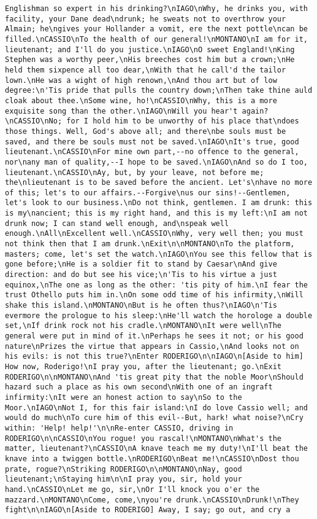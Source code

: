 \begin{verbatim}
Englishman so expert in his drinking?\nIAGO\nWhy, he drinks you, with facility, your Dane dead\ndrunk; he sweats not to overthrow your Almain; he\ngives your Hollander a vomit, ere the next pottle\ncan be filled.\nCASSIO\nTo the health of our general!\nMONTANO\nI am for it, lieutenant; and I'll do you justice.\nIAGO\nO sweet England!\nKing Stephen was a worthy peer,\nHis breeches cost him but a crown;\nHe held them sixpence all too dear,\nWith that he call'd the tailor lown.\nHe was a wight of high renown,\nAnd thou art but of low degree:\n'Tis pride that pulls the country down;\nThen take thine auld cloak about thee.\nSome wine, ho!\nCASSIO\nWhy, this is a more exquisite song than the other.\nIAGO\nWill you hear't again?\nCASSIO\nNo; for I hold him to be unworthy of his place that\ndoes those things. Well, God's above all; and there\nbe souls must be saved, and there be souls must not be saved.\nIAGO\nIt's true, good lieutenant.\nCASSIO\nFor mine own part,--no offence to the general, nor\nany man of quality,--I hope to be saved.\nIAGO\nAnd so do I too, lieutenant.\nCASSIO\nAy, but, by your leave, not before me; the\nlieutenant is to be saved before the ancient. Let's\nhave no more of this; let's to our affairs.--Forgive\nus our sins!--Gentlemen, let's look to our business.\nDo not think, gentlemen. I am drunk: this is my\nancient; this is my right hand, and this is my left:\nI am not drunk now; I can stand well enough, and\nspeak well enough.\nAll\nExcellent well.\nCASSIO\nWhy, very well then; you must not think then that I am drunk.\nExit\n\nMONTANO\nTo the platform, masters; come, let's set the watch.\nIAGO\nYou see this fellow that is gone before;\nHe is a soldier fit to stand by Caesar\nAnd give direction: and do but see his vice;\n'Tis to his virtue a just equinox,\nThe one as long as the other: 'tis pity of him.\nI fear the trust Othello puts him in.\nOn some odd time of his infirmity,\nWill shake this island.\nMONTANO\nBut is he often thus?\nIAGO\n'Tis evermore the prologue to his sleep:\nHe'll watch the horologe a double set,\nIf drink rock not his cradle.\nMONTANO\nIt were well\nThe general were put in mind of it.\nPerhaps he sees it not; or his good nature\nPrizes the virtue that appears in Cassio,\nAnd looks not on his evils: is not this true?\nEnter RODERIGO\n\nIAGO\n[Aside to him] How now, Roderigo!\nI pray you, after the lieutenant; go.\nExit RODERIGO\n\nMONTANO\nAnd 'tis great pity that the noble Moor\nShould hazard such a place as his own second\nWith one of an ingraft infirmity:\nIt were an honest action to say\nSo to the Moor.\nIAGO\nNot I, for this fair island:\nI do love Cassio well; and would do much\nTo cure him of this evil--But, hark! what noise?\nCry within: 'Help! help!'\n\nRe-enter CASSIO, driving in RODERIGO\n\nCASSIO\nYou rogue! you rascal!\nMONTANO\nWhat's the matter, lieutenant?\nCASSIO\nA knave teach me my duty!\nI'll beat the knave into a twiggen bottle.\nRODERIGO\nBeat me!\nCASSIO\nDost thou prate, rogue?\nStriking RODERIGO\n\nMONTANO\nNay, good lieutenant;\nStaying him\n\nI pray you, sir, hold your hand.\nCASSIO\nLet me go, sir,\nOr I'll knock you o'er the mazzard.\nMONTANO\nCome, come,\nyou're drunk.\nCASSIO\nDrunk!\nThey fight\n\nIAGO\n[Aside to RODERIGO] Away, I say; go out, and cry a 
\end{verbatim}
